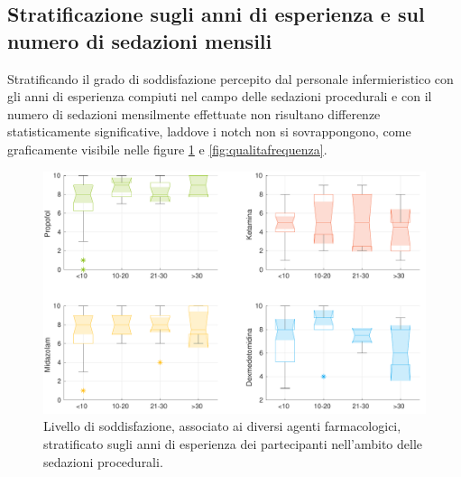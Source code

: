 \newpage
\subsection*{Stratificazione sugli anni di esperienza e sul numero di sedazioni mensili}

Stratificando il grado di soddisfazione percepito dal personale infermieristico con gli anni di esperienza compiuti nel campo delle sedazioni procedurali e con il numero di sedazioni mensilmente effettuate non risultano differenze statisticamente significative, laddove i notch non si sovrappongono, come graficamente visibile nelle figure \ref{fig:qualitaesperienza} e \ref {fig:qualitafrequenza}.

\begin{figure}[h]
    \centering
    \includegraphics[width=1\textwidth]{Figure/qualita-strat-esperienza.pdf}
    \caption{Livello di soddisfazione, associato ai diversi agenti farmacologici, stratificato sugli anni di esperienza dei partecipanti nell'ambito delle sedazioni procedurali.}
    \label{fig:qualitaesperienza}
\end{figure}

